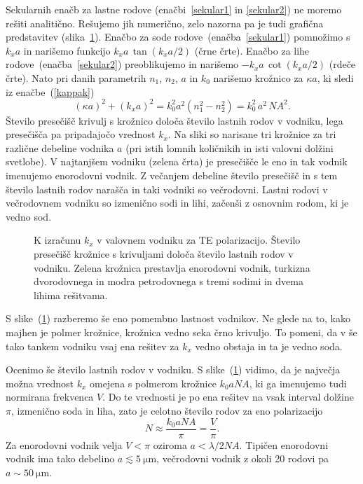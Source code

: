 Sekularnih enačb za lastne rodove (enačbi~\ref{sekular1} in \ref{sekular2}) ne moremo rešiti 
analitično. Rešujemo jih numerično, zelo nazorna pa je tudi grafična predstavitev
(slika~\ref{fig:TEsec}). Enačbo za sode rodove~(enačba~\ref{sekular1}) pomnožimo s 
$k_xa$ in narišemo funkcijo $k_xa\, \tan (k_xa/2)$ (črne črte). Enačbo za lihe 
rodove~(enačba~\ref{sekular2}) preoblikujemo in narišemo $-k_xa\, \cot (k_xa/2)$ (rdeče črte).
Nato pri danih parametrih $n_1$, $n_2$, $a$ in $k_0$ narišemo krožnico za $\kappa a$, 
ki sledi iz enačbe~(\ref{kappak})
\begin{equation}
 (\kappa a)^2+ (k_x a)^{2}=k_{0}^{2} a^2\left(n_{1}^{2}-n_{2}^{2}\right) = k_0^2\,a^2\,NA^2.
\end{equation}
Število presečišč krivulj s krožnico določa število lastnih rodov v vodniku, lega presečišča
pa pripadajočo vrednost $k_x$. Na sliki so narisane tri krožnice za 
tri različne debeline vodnika $a$ (pri istih lomnih količnikih in isti valovni 
dolžini svetlobe). V najtanjšem vodniku (zelena črta) je presečišče
le eno in tak vodnik imenujemo enorodovni vodnik. 
Z večanjem debeline število presečišč in s tem število lastnih rodov narašča in taki vodniki so 
večrodovni. Lastni rodovi v večrodovnem vodniku
so izmenično sodi in lihi, začenši z osnovnim rodom, ki je vedno sod. 
\begin{figure}[h]
\centering
\def\svgwidth{70truemm} 

\caption{K izračunu $k_x$ v valovnem vodniku
za TE polarizacijo. Število presečišč krožnice s krivuljami določa število lastnih rodov 
v vodniku. Zelena krožnica prestavlja enorodovni vodnik, turkizna dvorodovnega in modra
petrodovnega s tremi sodimi in dvema lihima rešitvama.}
\label{fig:TEsec}
\end{figure}

S slike~(\ref{fig:TEsec}) razberemo še eno pomembno lastnost vodnikov. 
Ne glede na to, kako majhen je polmer krožnice, krožnica vedno seka črno krivuljo. 
To pomeni, da v še tako tankem vodniku vsaj ena rešitev za $k_x$ vedno obstaja
in ta je vedno soda. 

Ocenimo še število lastnih rodov v vodniku. S slike~(\ref{fig:TEsec}) vidimo, da je 
največja možna vrednost $k_x$ omejena s polmerom krožnice $k_0aNA$, ki ga imenujemo
tudi normirana frekvenca $V$. Do te vrednosti je 
po ena rešitev na vsak interval dolžine $\pi$, izmenično soda in liha, 
zato je celotno število rodov za eno polarizacijo
\begin{equation}
N \approx \frac{k_0 a NA}{\pi} = \frac{V}{\pi}.
\end{equation}
Za enorodovni vodnik velja $V < \pi$ oziroma $a< \lambda/2 NA$.
Tipičen enorodovni vodnik ima tako debelino $a\lesssim 5~\si{\micro\meter}$, 
večrodovni vodnik z okoli 20 rodovi pa $a\sim 50~\si{\micro\meter}$.

